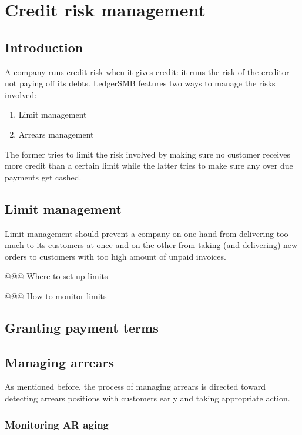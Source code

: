 \chapter{Credit risk management}
\label{cha:credit-risk-management}

\section{Introduction}

A company runs credit risk when it gives credit: it runs the risk of the
creditor not paying off its debts.  LedgerSMB features two ways to manage
the risks involved:

\begin{enumerate}
\item Limit management
\item Arrears management
\end{enumerate}

The former tries to limit the risk involved by making sure no customer
receives more credit than a certain limit while the latter tries to
make sure any over due payments get cashed.

\section{Limit management}

Limit management should prevent a company on one hand from delivering too much
to its customers at once and on the other from taking (and delivering) new orders
to customers with too high amount of unpaid invoices.



@@@ Where to set up limits

@@@ How to monitor limits



\section{Granting payment terms}

\section{Managing arrears}

As mentioned before, the process of managing arrears is directed toward
detecting arrears positions with customers early and taking appropriate
action.


\subsection{Monitoring AR aging}
\label{subsec:MonitoringAging}

